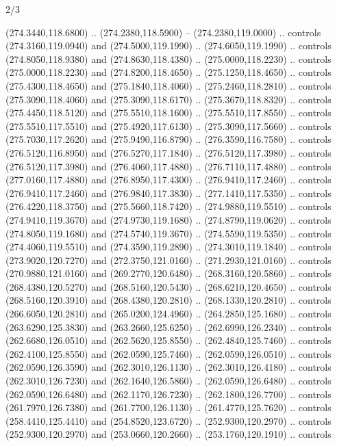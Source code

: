\begin{flagdescription}{2/3}
\begin{scope}[xshift=0.5\flaglength,yshift=0.5\flagwidth,scale=\flagwidth/259.2]
\begin{scope}[y=0.8pt, x=0.8pt, yscale=-1,shift={(-243,-162)}]
      (274.3440,118.6800) .. (274.2380,118.5900) -- (274.2380,119.0000) .. controls
      (274.3160,119.0940) and (274.5000,119.1990) .. (274.6050,119.1990) .. controls
      (274.8050,118.9380) and (274.8630,118.4380) .. (275.0000,118.2230) .. controls
      (275.0000,118.2230) and (274.8200,118.4650) .. (275.1250,118.4650) .. controls
      (275.4300,118.4650) and (275.1840,118.4060) .. (275.2460,118.2810) .. controls
      (275.3090,118.4060) and (275.3090,118.6170) .. (275.3670,118.8320) .. controls
      (275.4450,118.5120) and (275.5510,118.1600) .. (275.5510,117.8550) .. controls
      (275.5510,117.5510) and (275.4920,117.6130) .. (275.3090,117.5660) .. controls
      (275.7030,117.2620) and (275.9490,116.8790) .. (276.3590,116.7580) .. controls
      (276.5120,116.8950) and (276.5270,117.1840) .. (276.5120,117.3980) .. controls
      (276.5120,117.3980) and (276.4060,117.4880) .. (276.7110,117.4880) .. controls
      (277.0160,117.4880) and (276.8950,117.4300) .. (276.9410,117.2460) .. controls
      (276.9410,117.2460) and (276.9840,117.3830) .. (277.1410,117.5350) .. controls
      (276.4220,118.3750) and (275.5660,118.7420) .. (274.9880,119.5510) .. controls
      (274.9410,119.3670) and (274.9730,119.1680) .. (274.8790,119.0620) .. controls
      (274.8050,119.1680) and (274.5740,119.3670) .. (274.5590,119.5350) .. controls
      (274.4060,119.5510) and (274.3590,119.2890) .. (274.3010,119.1840) .. controls
      (273.9020,120.7270) and (272.3750,121.0160) .. (271.2930,121.0160) .. controls
      (270.9880,121.0160) and (269.2770,120.6480) .. (268.3160,120.5860) .. controls
      (268.4380,120.5270) and (268.5160,120.5430) .. (268.6210,120.4650) .. controls
      (268.5160,120.3910) and (268.4380,120.2810) .. (268.1330,120.2810) .. controls
      (266.6050,120.2810) and (265.0200,124.4960) .. (264.2850,125.1680) .. controls
      (263.6290,125.3830) and (263.2660,125.6250) .. (262.6990,126.2340) .. controls
      (262.6680,126.0510) and (262.5620,125.8550) .. (262.4840,125.7460) .. controls
      (262.4100,125.8550) and (262.0590,125.7460) .. (262.0590,126.0510) .. controls
      (262.0590,126.3590) and (262.3010,126.1130) .. (262.3010,126.4180) .. controls
      (262.3010,126.7230) and (262.1640,126.5860) .. (262.0590,126.6480) .. controls
      (262.0590,126.6480) and (262.1170,126.7230) .. (262.1800,126.7700) .. controls
      (261.7970,126.7380) and (261.7700,126.1130) .. (261.4770,125.7620) .. controls
      (258.4410,125.4410) and (254.8520,123.6720) .. (252.9300,120.2970) .. controls
      (252.9300,120.2970) and (253.0660,120.2660) .. (253.1760,120.1910) .. controls

\end{scope}
\end{scope}
\end{flagdescription}
